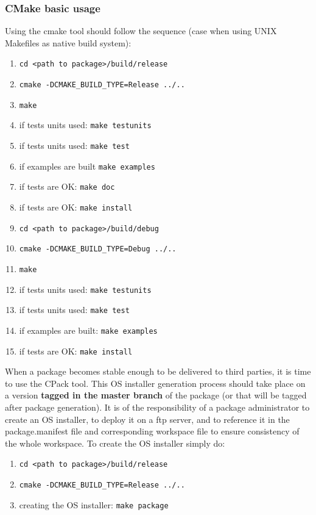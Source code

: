 \documentclass[12pt,a4paper]{article}
\begin{document}
\subsubsection{CMake basic usage}

Using the cmake tool should follow the sequence (case when using UNIX Makefiles as native build system):
\begin{enumerate}
\item \verb|cd <path to package>/build/release|
\item \verb|cmake -DCMAKE_BUILD_TYPE=Release ../..|
\item \verb|make|
\item if tests units used: \verb|make testunits|
\item if tests units used: \verb|make test|
\item if examples are built \verb|make examples|
\item if tests are OK: \verb|make doc|
\item if tests are OK: \verb|make install|
\item \verb|cd <path to package>/build/debug|
\item \verb|cmake -DCMAKE_BUILD_TYPE=Debug ../..|
\item \verb|make|
\item if tests units used: \verb|make testunits|
\item if tests units used: \verb|make test|
\item if examples are built: \verb|make examples|
\item if tests are OK: \verb|make install|
\end{enumerate}

When a package becomes stable enough to be delivered to third parties, it is time to use the CPack tool. This OS installer generation process should take place on a version \textbf{tagged in the master branch} of the package (or that will be tagged after package generation). It is of the responsibility of a package administrator to create an OS installer, to deploy it on a ftp server, and to reference it in the package.manifest file and corresponding workspace file to ensure consistency of the whole workspace. To create the OS installer simply do:
\begin{enumerate}
\item \verb|cd <path to package>/build/release|
\item \verb|cmake -DCMAKE_BUILD_TYPE=Release ../..|
\item creating the OS installer: \verb|make package|
\end{enumerate}
\end{document}
